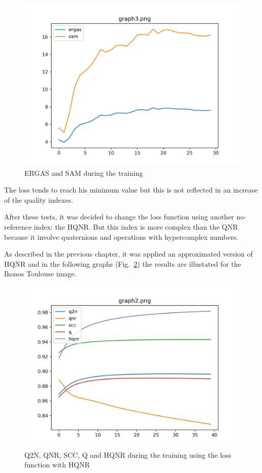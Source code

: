 \documentclass[12pt]{report}
\begin{document}
\begin{figure}
    \centering
    \includegraphics[scale=.5]{qnr3.png}
    \caption{ERGAS and SAM during the training}
    \label{fig:qnr3}
\end{figure}

The loss tends to reach his minimum value but this is not reflected in an increase of the quality indexes. 

After these tests, it was decided to change the loss function using another no-reference index: the HQNR.
But this index is more complex than the QNR because it involve quaternions and operations with hypercomplex numbers.

As described in the previous chapter, it was applied an approximated version of HQNR and in the following graphs (Fig.~\ref{fig:hqnr1})
the results are illustated for the Ikonos Toulouse image.


\begin{figure}[t]
    \centering
    \includegraphics[scale=.2]{toulouse_noref.jpeg}
    \caption{Q2N, QNR, SCC, Q and HQNR during the training using the loss function with HQNR}
    \label{fig:hqnr1}
\end{figure}
\end{document}
